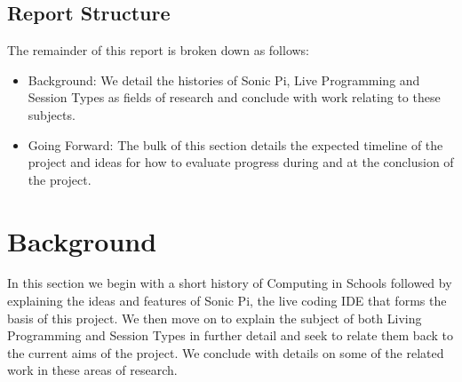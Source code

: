 \documentclass[11pt]{scrartcl}
\begin{document}

\subsection{Report Structure}
The remainder of this report is broken down as follows:

\begin{itemize}
	\item Background: We detail the histories of Sonic Pi, Live Programming 
	and Session Types as fields of research and conclude with work relating to
	these subjects.

	\item Going Forward: The bulk of this section details the expected 
	timeline of the project and ideas for how to evaluate progress during and 
	at the conclusion of the project.
\end{itemize}
\newpage

\section{Background}
In this section we begin with a short history of Computing in Schools followed 
by explaining the ideas and features of Sonic Pi, the live coding IDE that forms 
the basis of this project. We then move on to explain the subject of both Living 
Programming and Session Types in further detail and seek to relate them back to 
the current aims of the project. We conclude with details on some of the related 
work in these areas of research.
\end{document}
